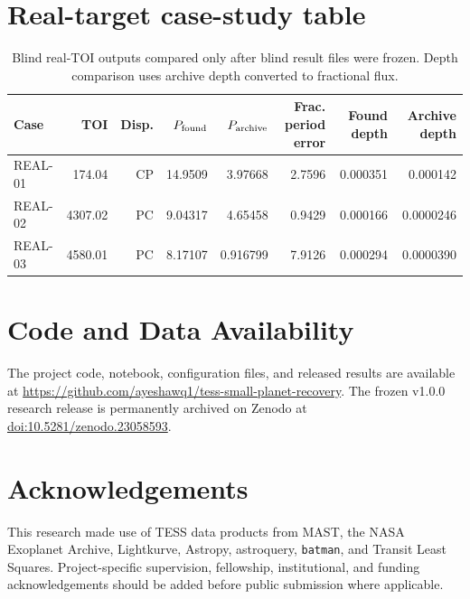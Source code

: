 \documentclass[11pt]{article}
\begin{document}
\section{Real-target case-study table}
\begin{table}[htbp]
\centering
\caption{Blind real-TOI outputs compared only after blind result files were frozen. Depth comparison uses archive depth converted to fractional flux.}
\small
\begin{tabular}{lrrrrrrr}
\toprule
Case & TOI & Disp. & $P_{\rm found}$ & $P_{\rm archive}$ & Frac. period error & Found depth & Archive depth\\
\midrule
REAL-01 & 174.04  & CP & 14.9509 & 3.97668 & 2.7596 & 0.000351 & 0.000142\\
REAL-02 & 4307.02 & PC & 9.04317 & 4.65458 & 0.9429 & 0.000166 & 0.0000246\\
REAL-03 & 4580.01 & PC & 8.17107 & 0.916799 & 7.9126 & 0.000294 & 0.0000390\\
\bottomrule
\end{tabular}
\end{table}

\section*{Code and Data Availability}

The project code, notebook, configuration files, and released results are available at
\url{https://github.com/ayeshawq1/tess-small-planet-recovery}.
The frozen v1.0.0 research release is permanently archived on Zenodo at
\href{https://doi.org/10.5281/zenodo.23058593}{doi:10.5281/zenodo.23058593}.

\section*{Acknowledgements}
This research made use of TESS data products from MAST, the NASA Exoplanet Archive, Lightkurve, Astropy, astroquery, \texttt{batman}, and Transit Least Squares. Project-specific supervision, fellowship, institutional, and funding acknowledgements should be added before public submission where applicable.
\end{document}
